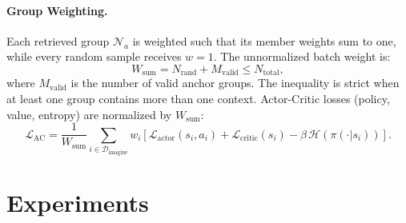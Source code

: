 \documentclass{article} %
\begin{document}
\paragraph{Group Weighting.}
Each retrieved group $\mathcal{N}_a$ is weighted such that its member weights sum to one, while every random sample receives $w=1$. The unnormalized batch weight is:
\begin{equation}
W_{\text{sum}} = N_{\text{rand}} + M_{\text{valid}} \leq N_{\text{total}},
\label{eq:weight_sum}
\end{equation}
where $M_{\text{valid}}$ is the number of valid anchor groups. The inequality is strict when at least one group contains more than one context.
Actor-Critic losses (policy, value, entropy) are normalized by $W_{\text{sum}}$:
\begin{equation}
\mathcal{L}_{\text{AC}} = \frac{1}{W_{\text{sum}}} \sum_{i \in \mathcal{D}_{\text{imagine}}} w_i \left[\mathcal{L}_{\text{actor}}(s_i, a_i) + \mathcal{L}_{\text{critic}}(s_i) - \beta \, \mathcal{H}(\pi(\cdot | s_i))\right].
\label{eq:weighted_loss}
\end{equation}


\section{Experiments}
\label{sec:experiments}
\end{document}
